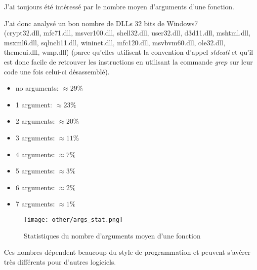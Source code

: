 ﻿
\label{args_stat}

J'ai toujours été intéressé par le nombre moyen d'arguments d'une fonction.

J'ai donc analysé un bon nombre de DLLs 32 bits de Windows7\\
(crypt32.dll, mfc71.dll, msvcr100.dll, shell32.dll, 
user32.dll, d3d11.dll, mshtml.dll, msxml6.dll, sqlncli11.dll, wininet.dll, mfc120.dll, msvbvm60.dll, 
ole32.dll, themeui.dll, wmp.dll) 
(parce qu'elles utilisent la convention d'appel \emph{stdcall} et qu'il est donc facile de retrouver 
les instructions  en utilisant la commande \emph{grep} sur leur code une fois celui-ci 
désassemblé).

\begin{itemize}
\item no arguments: $\approx 29\%$
\item 1 argument: $\approx 23\%$
\item 2 arguments: $\approx 20\%$
\item 3 arguments: $\approx 11\%$
\item 4 arguments: $\approx 7\%$
\item 5 arguments: $\approx 3\%$
\item 6 arguments: $\approx 2\%$
\item 7 arguments: $\approx 1\%$
\end{itemize}

\begin{figure}[H]
\centering
\texttt{[image: other/args\_stat.png]}
\caption{Statistiques du nombre d'arguments moyen d'une fonction}
\end{figure}

Ces nombres dépendent beaucoup du style de programmation et peuvent s'avérer très différents pour 
d'autres logiciels.

